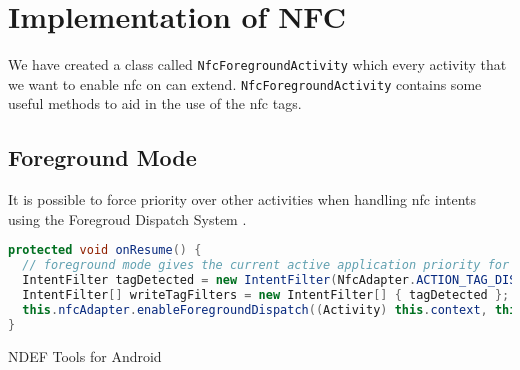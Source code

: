\section{Implementation of NFC}
We have created a class called \lstinline|NfcForegroundActivity| which every activity that we want to enable \ac{nfc} on can extend. \lstinline|NfcForegroundActivity| contains some useful methods to aid in the use of the \ac{nfc} tags.

\subsection{Foreground Mode}
\label{sec:foeground}

It is possible to force priority over other activities when handling \ac{nfc} intents using the Foregroud Dispatch System \citep{foregroundDispatch}.

\begin{lstlisting}[language=java, caption=Foreground mode enabling]
protected void onResume() {
  // foreground mode gives the current active application priority for reading scanned tags
  IntentFilter tagDetected = new IntentFilter(NfcAdapter.ACTION_TAG_DISCOVERED); // filter for tags
  IntentFilter[] writeTagFilters = new IntentFilter[] { tagDetected };
  this.nfcAdapter.enableForegroundDispatch((Activity) this.context, this.nfcPendingIntent, writeTagFilters, null);
}
\end{lstlisting}


NDEF Tools for Android \citep{ndeftools}